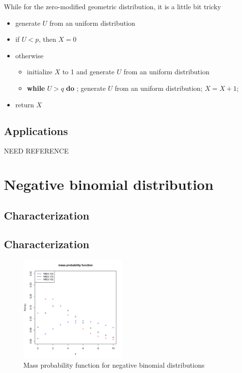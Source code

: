 While for the zero-modified geometric distribution, it is a little bit tricky
\begin{itemize}
\item generate $U$ from an uniform distribution
\item if $U< p$, then $X=0$
\item otherwise 
	\begin{itemize}
         \item initialize $X$ to 1 and generate $U$ from an uniform distribution
	\item \textbf{while} $U>q$ \textbf{do} ; generate $U$ from an uniform distribution; $X=X+1$;
	\end{itemize}
\item return $X$	
\end{itemize}

\subsection{Applications}
NEED REFERENCE

\section{Negative binomial distribution}
\subsection{Characterization}
\subsection{Characterization}
\begin{figure}
  \vspace{-30pt}
  \begin{center}
    \includegraphics[width=0.48\textwidth]{img/negbinomzoom}
  \end{center}
  \caption{Mass probability function for negative binomial distributions}
\end{figure}


